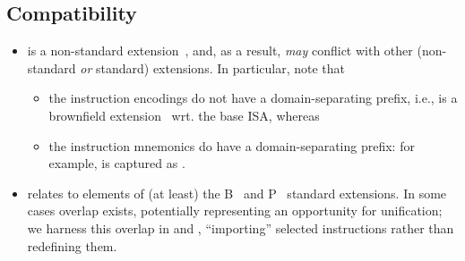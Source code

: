 
\subsection{Compatibility}
\label{sec:bg:compatibility}

\begin{itemize}

\item \XCRYPTO is a 
      non-standard extension~\cite[Section 21.1]{SCARV:RV:ISA:I}, 
      and, as a result, {\em may} conflict with other 
      (non-standard {\em or} standard)
      extensions.  In particular, note that

      \begin{itemize}
      \item the 
            instruction encodings
            do not have a domain-separating prefix, i.e., \XCRYPTO is a
            brownfield extension~\cite[Section 21.1]{SCARV:RV:ISA:I}
            wrt. the base ISA,
            whereas
      \item the 
            instruction mnemonics 
            do     have a domain-separating prefix:
            for example,  is captured as .
      \end{itemize}

\item \XCRYPTO relates to elements of (at least) the
      B~\cite[Chapter 17]{SCARV:RV:ISA:II}
      and
      P~\cite[Chapter 20]{SCARV:RV:ISA:II}
      standard extensions.
      In some cases overlap exists, potentially representing an opportunity
      for unification; we harness this overlap in 
      and
      ,
      ``importing'' selected instructions rather than redefining them.

\end{itemize}

